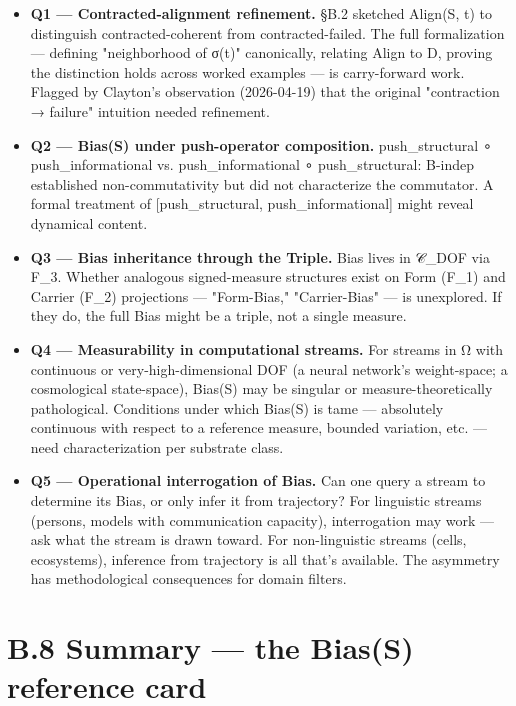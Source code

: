 \documentclass[11pt, openany]{book}
\newcommand{\sectionbreak}{\clearpage}
\begin{document}
\begin{itemize}
\item \textbf{Q1 --- Contracted-alignment refinement.} §B.2 sketched Align(S, t) to distinguish contracted-coherent from contracted-failed. The full formalization --- defining "neighborhood of σ(t)" canonically, relating Align to D, proving the distinction holds across worked examples --- is carry-forward work. Flagged by Clayton's observation (2026-04-19) that the original "contraction → failure" intuition needed refinement.
\item \textbf{Q2 --- Bias(S) under push-operator composition.} push\_\allowbreak{}structural ∘ push\_\allowbreak{}informational vs. push\_\allowbreak{}informational ∘ push\_\allowbreak{}structural: B-indep established non-commutativity but did not characterize the commutator. A formal treatment of [push\_\allowbreak{}structural, push\_\allowbreak{}informational] might reveal dynamical content.
\item \textbf{Q3 --- Bias inheritance through the Triple.} Bias lives in 𝒞\_\allowbreak{}DOF via F\_\allowbreak{}3. Whether analogous signed-measure structures exist on Form (F\_\allowbreak{}1) and Carrier (F\_\allowbreak{}2) projections --- "Form-Bias," "Carrier-Bias" --- is unexplored. If they do, the full Bias might be a triple, not a single measure.
\item \textbf{Q4 --- Measurability in computational streams.} For streams in Ω with continuous or very-high-dimensional DOF (a neural network's weight-space; a cosmological state-space), Bias(S) may be singular or measure-theoretically pathological. Conditions under which Bias(S) is tame --- absolutely continuous with respect to a reference measure, bounded variation, etc. --- need characterization per substrate class.
\item \textbf{Q5 --- Operational interrogation of Bias.} Can one query a stream to determine its Bias, or only infer it from trajectory? For linguistic streams (persons, models with communication capacity), interrogation may work --- ask what the stream is drawn toward. For non-linguistic streams (cells, ecosystems), inference from trajectory is all that's available. The asymmetry has methodological consequences for domain filters.
\end{itemize}

\sectionbreak

\section{B.8 Summary --- the Bias(S) reference card}
\end{document}
